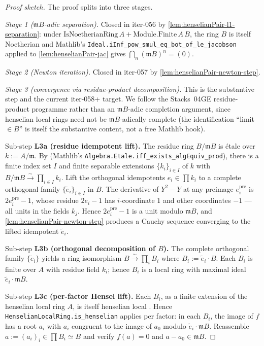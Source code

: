 \begin{proof}[Proof sketch]
The proof splits into three stages.

\emph{Stage 1 ($\mathfrak m B$-adic separation).} Closed in
iter-056 by \cref{lem:henselianPair-l1-separation}: under
$\mathrm{IsNoetherianRing}\,A + \mathrm{Module.Finite}\,A\,B$,
the ring $B$ is itself Noetherian and Mathlib's
\texttt{Ideal.iInf\_pow\_smul\_eq\_bot\_of\_le\_jacobson} applied
to \cref{lem:henselianPair-jac} gives $\bigcap_n (\mathfrak m B)^n
= (0)$.

\emph{Stage 2 (Newton iteration).} Closed in iter-057 by
\cref{lem:henselianPair-newton-step}.

\emph{Stage 3 (convergence via residue-product decomposition).}
This is the substantive step and the current iter-058+ target.
We follow the Stacks~04GE residue-product programme rather than
an $\mathfrak m B$-adic completion argument, since henselian
local rings need not be $\mathfrak m B$-adically complete (the
identification ``limit $\in B$'' is itself the substantive
content, not a free Mathlib hook).

Sub-step \textbf{L3a (residue idempotent lift).} The residue ring
$B / \mathfrak m B$ is étale over $k := A / \mathfrak m$. By
\cite[Tag~00U7]{stacks} (Mathlib's
\texttt{Algebra.Etale.iff\_exists\_algEquiv\_prod}), there is a
finite index set $I$ and finite separable extensions
$\{k_i\}_{i \in I}$ of $k$ with
$B / \mathfrak m B \xrightarrow{\sim} \prod_{i \in I} k_i$. Lift
the orthogonal idempotents $e_i \in \prod k_i$ to a complete
orthogonal family $\{\tilde e_i\}_{i \in I}$ in $B$. The
derivative of $Y^2 - Y$ at any preimage $e^{\mathrm{pre}}_i$ is
$2 e^{\mathrm{pre}}_i - 1$, whose residue $2 e_i - 1$ has
$i$-coordinate $1$ and other coordinates $-1$ — all units in the
fields $k_j$. Hence $2 e^{\mathrm{pre}}_i - 1$ is a unit modulo
$\mathfrak m B$, and \cref{lem:henselianPair-newton-step} produces
a Cauchy sequence converging to the lifted idempotent
$\tilde e_i$.

Sub-step \textbf{L3b (orthogonal decomposition of $B$).} The
complete orthogonal family $\{\tilde e_i\}$ yields a ring
isomorphism $B \xrightarrow{\sim} \prod_i B_i$ where
$B_i := \tilde e_i \cdot B$. Each $B_i$ is finite over $A$ with
residue field $k_i$; hence $B_i$ is a local ring with maximal
ideal $\tilde e_i \cdot \mathfrak m B$.

Sub-step \textbf{L3c (per-factor Hensel lift).} Each $B_i$, as a
finite extension of the henselian local ring $A$, is itself
henselian local \cite[Tag~04GH]{stacks}. Hence
\texttt{HenselianLocalRing.is\_henselian} applies per factor: in
each $B_i$, the image of $f$ has a root $a_i$ with $a_i$
congruent to the image of $a_0$ modulo $\tilde e_i \cdot
\mathfrak m B$. Reassemble $a := (a_i)_i \in \prod B_i \simeq B$
and verify $f(a) = 0$ and $a - a_0 \in \mathfrak m B$.
\end{proof}

